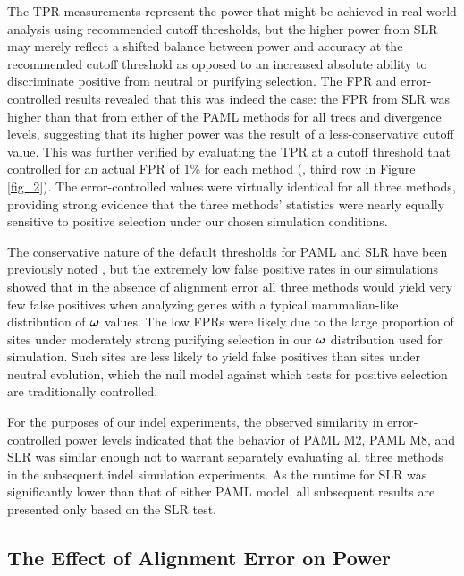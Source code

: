 \documentclass{article}
\begin{document}
The TPR measurements represent the power that might be achieved in
real-world analysis using recommended cutoff thresholds, but the
higher power from SLR may merely reflect a shifted balance between
power and accuracy at the recommended cutoff threshold as opposed to
an increased absolute ability to discriminate positive from neutral or
purifying selection. The FPR and error-controlled \tpr results
revealed that this was indeed the case: the FPR from SLR was higher
than that from either of the PAML methods for all trees and divergence
levels, suggesting that its higher power was the result of a
less-conservative cutoff value. This was further verified by
evaluating the TPR at a cutoff threshold that controlled for an actual
FPR of 1\% for each method (\tpr{}, third row in Figure
\ref{fig_2}). The error-controlled \tpr values were virtually
identical for all three methods, providing strong evidence that the
three methods' \sw statistics were nearly equally sensitive to
positive selection under our chosen simulation conditions.

The conservative nature of the default thresholds for PAML and SLR
have been previously noted
\citep{Anisimova2002Accuracy,Yang2005Bayes,Massingham2005Detecting},
but the extremely low false positive rates in our simulations showed
that in the absence of alignment error all three methods would yield
very few false positives when analyzing genes with a typical
mammalian-like distribution of $\bm{\omega}$ values. The low FPRs were likely
due to the large proportion of sites under moderately strong purifying
selection in our $\bm{\omega}$ distribution used for simulation. Such sites
are less likely to yield false positives than sites under neutral
evolution, which the null model against which tests for positive
selection are traditionally controlled.

For the purposes of our indel experiments, the observed similarity in
error-controlled power levels indicated that the behavior of PAML M2,
PAML M8, and SLR was similar enough not to warrant separately
evaluating all three methods in the subsequent indel simulation
experiments. As the runtime for SLR was significantly lower than that
of either PAML model, all subsequent results are presented only based
on the SLR test.

\subsection*{The Effect of Alignment Error on \Sw Power}
\end{document}
